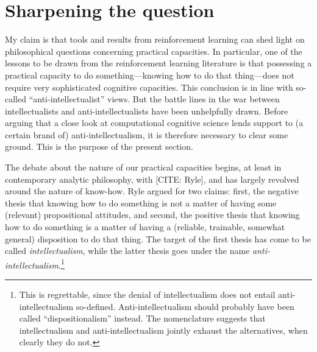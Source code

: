 \documentclass{article}
\begin{document}
\section{Sharpening the question}

My claim is that tools and results from reinforcement learning can shed light on philosophical questions concerning practical capacities.
In particular, one of the lessons to be drawn from the reinforcement learning literature is that possessing a practical capacity to do something---knowing how to do that thing---does not require very sophisticated cognitive capacities.
This conclusion is in line with so-called ``anti-intellectualist'' views.
But the battle lines in the war between intellectualists and anti-intellectualists have been unhelpfully drawn.
Before arguing that a close look at computational cognitive science lends support to (a certain brand of) anti-intellectualism, it is therefore necessary to clear some ground.
This is the purpose of the present section.

The debate about the nature of our practical capacities begins, at least in contemporary analytic philosophy, with [CITE: Ryle], and has largely revolved around the nature of know-how.
Ryle argued for two claims: first, the negative thesis that knowing how to do something is not a matter of having some (relevant) propositional attitudes, and second, the positive thesis that knowing how to do something is a matter of having a (reliable, trainable, somewhat general) disposition to do that thing.
The target of the first thesis has come to be called \emph{intellectualism}, while the latter thesis goes under the name \emph{anti-intellectualism}.\footnote{This is regrettable, since the denial of intellectualism does not entail anti-intellectualism so-defined.
Anti-intellectualism should probably have been called ``dispositionalism'' instead.
The nomenclature suggests that intellectualism and anti-intellectualism jointly exhaust the alternatives, when clearly they do not.}
\end{document}
